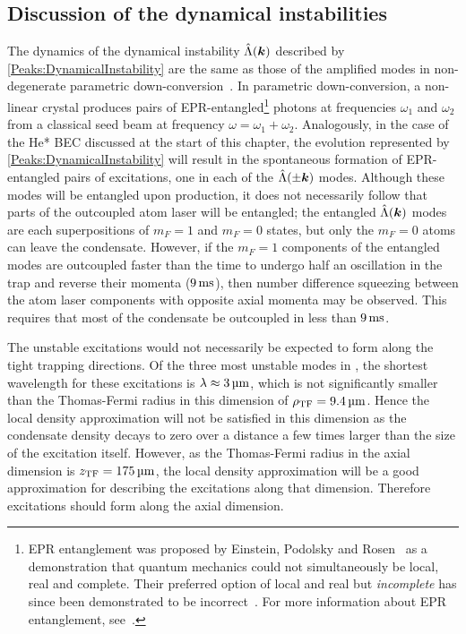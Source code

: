 \subsection{Discussion of the dynamical instabilities}
\label{Peaks:DynamicalInstabilitiesDiscussion}

The dynamics of the dynamical instability $\hat{\Lambda}(\bm{k})$ described by \eqref{Peaks:DynamicalInstability} are the same as those of the amplified modes in non-degenerate parametric down-conversion~\citep{WallsMilburn}.  In parametric down-conversion, a non-linear crystal produces pairs of EPR-entangled\footnote{EPR entanglement was proposed by Einstein, Podolsky and Rosen~\citep{Einstein:1935} as a demonstration that quantum mechanics could not simultaneously be local, real and complete.  Their preferred option of local and real but \emph{incomplete} has since been demonstrated to be incorrect~\citep{Aspect:1982uq}.  For more information about EPR entanglement, see~\citep[Chapter 18]{Scully}.} photons at frequencies $\omega_1$ and $\omega_2$ from a classical seed beam at frequency $\omega = \omega_1 + \omega_2$.  Analogously, in the case of the He* BEC discussed at the start of this chapter, the evolution represented by \eqref{Peaks:DynamicalInstability} will result in the spontaneous formation of EPR-entangled pairs of excitations, one in each of the $\hat{\Lambda}(\pm \bm{k})$ modes. Although these modes will be entangled upon production, it does not necessarily follow that parts of the outcoupled atom laser will be entangled; the entangled $\hat{\Lambda}(\bm{k})$ modes are each superpositions of $m_F=1$ and $m_F=0$ states, but only the $m_F=0$ atoms can leave the condensate.  However, if the $m_F=1$ components of the entangled modes are outcoupled faster than the time to undergo half an oscillation in the trap and reverse their momenta ($\unit[9]{ms}$), then number difference squeezing between the atom laser components with opposite axial momenta may be observed.  This requires that most of the condensate be outcoupled in less than $\unit[9]{ms}$.

The unstable excitations would not necessarily be expected to form along the tight trapping directions. Of the three most unstable modes in , the shortest wavelength for these excitations is $\lambda \approx \unit[3]{\micro m}$, which is not significantly smaller than the Thomas-Fermi radius in this dimension of $\rho_\text{TF} = \unit[9.4]{\micro m}$. Hence the local density approximation will not be satisfied in this dimension as the condensate density decays to zero over a distance a few times larger than the size of the excitation itself.  However, as the Thomas-Fermi radius in the axial dimension is $z_\text{TF} = \unit[175]{\micro m}$, the local density approximation will be a good approximation for describing the excitations along that dimension. Therefore excitations should form along the axial dimension.

